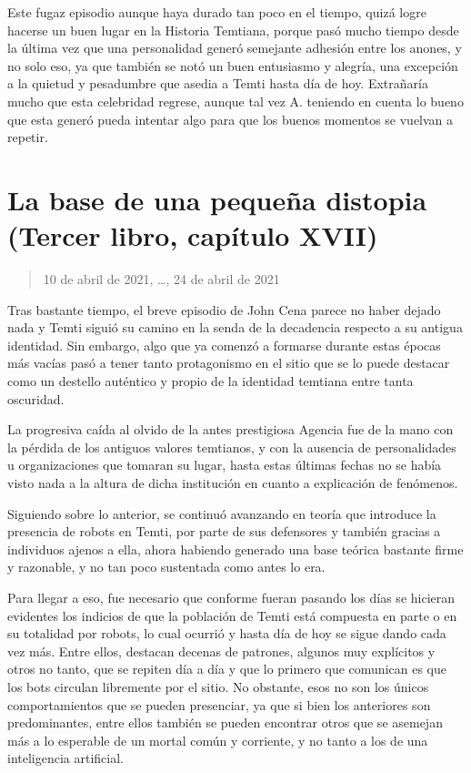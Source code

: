 \documentclass[
  spanish,
]{book}
\begin{document}
Este fugaz episodio aunque haya durado tan poco en el tiempo, quizá logre hacerse un buen lugar en la Historia Temtiana, porque pasó mucho tiempo desde la última vez que una personalidad generó semejante adhesión entre los anones, y no solo eso, ya que también se notó un buen entusiasmo y alegría, una excepción a la quietud y pesadumbre que asedia a Temti hasta día de hoy. Extrañaría mucho que esta celebridad regrese, aunque tal vez A. teniendo en cuenta lo bueno que esta generó pueda intentar algo para que los buenos momentos se vuelvan a repetir.

\hypertarget{la-base-de-una-pequeuxf1a-distopia-tercer-libro-capuxedtulo-xvii}{%
\section{La base de una pequeña distopia (Tercer libro, capítulo XVII)}\label{la-base-de-una-pequeuxf1a-distopia-tercer-libro-capuxedtulo-xvii}}

\begin{quote}
10 de abril de 2021, \ldots, 24 de abril de 2021
\end{quote}

Tras bastante tiempo, el breve episodio de John Cena parece no haber dejado nada y Temti siguió su camino en la senda de la decadencia respecto a su antigua identidad. Sin embargo, algo que ya comenzó a formarse durante estas épocas más vacías pasó a tener tanto protagonismo en el sitio que se lo puede destacar como un destello auténtico y propio de la identidad temtiana entre tanta oscuridad.

La progresiva caída al olvido de la antes prestigiosa Agencia fue de la mano con la pérdida de los antiguos valores temtianos, y con la ausencia de personalidades u organizaciones que tomaran su lugar, hasta estas últimas fechas no se había visto nada a la altura de dicha institución en cuanto a explicación de fenómenos.

Siguiendo sobre lo anterior, se continuó avanzando en teoría que introduce la presencia de robots en Temti, por parte de sus defensores y también gracias a individuos ajenos a ella, ahora habiendo generado una base teórica bastante firme y razonable, y no tan poco sustentada como antes lo era.

Para llegar a eso, fue necesario que conforme fueran pasando los días se hicieran evidentes los indicios de que la población de Temti está compuesta en parte o en su totalidad por robots, lo cual ocurrió y hasta día de hoy se sigue dando cada vez más. Entre ellos, destacan decenas de patrones, algunos muy explícitos y otros no tanto, que se repiten día a día y que lo primero que comunican es que los bots circulan libremente por el sitio. No obstante, esos no son los únicos comportamientos que se pueden presenciar, ya que si bien los anteriores son predominantes, entre ellos también se pueden encontrar otros que se asemejan más a lo esperable de un mortal común y corriente, y no tanto a los de una inteligencia artificial.
\end{document}
